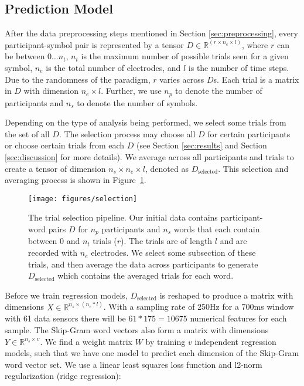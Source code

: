 \subsection{Prediction Model}
After the data preprocessing steps mentioned in Section \ref{sec:preprocessing}, every participant-symbol pair is represented by a tensor $D \in \mathbb{R}^{(r \times n_e \times l)}$, where $r$ can be between $0 \ldots n_t$, $n_t$ is the maximum number of possible trials seen for a given symbol, $n_e$ is the total number of electrodes, and $l$ is the number of time steps. Due to the randomness of the paradigm, $r$ varies across $D$s. Each trial is a matrix in $D$ with dimension $n_e \times l$. Further, we use $n_p$ to denote the number of participants and $n_s$ to denote the number of symbols. 

Depending on the type of analysis being performed, we select some trials from the set of all $D$. The selection process may choose all $D$ for certain participants or choose certain trials from each $D$ (see Section \ref{sec:results} and Section \ref{sec:discussion} for more details). We average across all participants and trials to create a tensor of dimension $n_s \times n_e \times l$, denoted as $D_\text{selected}$. This selection and averaging process is shown in Figure~\ref{fig:selection}.

\begin{figure}[t]
 \centerline{
   \texttt{[image: figures/selection]}
 }
 \caption{The trial selection pipeline. Our initial data contains participant-word pairs $D$ for $n_p$ participants and $n_s$ words that each contain between 0 and $n_t$ trials ($r$). The trials are of length $l$ and are recorded with $n_e$ electrodes. We select some subsection of these trials, and then average the data across participants to generate $D_{\text{selected}}$ which contains the averaged trials for each word.}
 \label{fig:selection}
\end{figure}

Before we train regression models, $D_{\text{selected}}$ is reshaped to produce a matrix with dimensions $X \in \mathbb{R}^{n_s \times (n_e * l)}$.  With a sampling rate of 250Hz for a 700ms window with 61 data sensors there will be $61*175 = 10675$ numerical features for each sample. The Skip-Gram word vectors also form a matrix with dimensions $Y \in \mathbb{R}^{n_s \times v}$. We find a weight matrix $W$ by training $v$ independent regression models, such that we have one model to predict each dimension of the Skip-Gram word vector set. We use a linear least squares loss function and l2-norm regularization (ridge regression):

